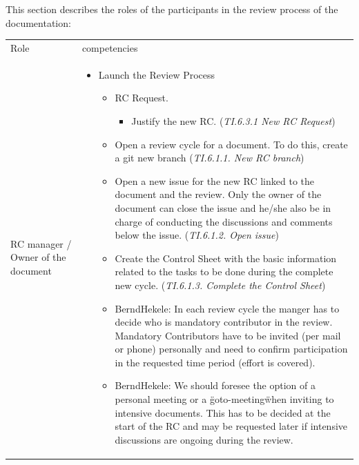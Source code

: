 \documentclass{template/openetcs_article}
\begin{document}
This section describes  the roles of the participants in the review process of the documentation:

\begin{flushleft}

\begin{tabular}{|m{3cm}|m{11cm}|}
\hline
\rowcolor{myblue}
\multicolumn{2}{|c|}{Roles} \\\hline
\rowcolor{lightgray}
Role &
competencies \\\hline
RC manager / Owner of the document &
\begin{itemize}
\item Launch the Review Process
\begin{itemize}
\item RC Request.
\begin{itemize}
\item Justify the new RC. ({\it TI.6.3.1 New RC Request})
\end{itemize}
\item Open a review cycle for a document. To do this, create a git new branch ({\it TI.6.1.1. New RC branch}) 
\item Open a new issue for the new RC linked to the document and the review. Only the owner of the document can close the issue and he/she also be in charge of conducting the discussions and comments below the issue.  ({\it TI.6.1.2. Open issue})
\item Create the Control Sheet with the basic information related to the tasks to be done during the complete new cycle. ({\it TI.6.1.3. Complete the Control Sheet})
\item BerndHekele: In each review cycle the manger has to decide who is mandatory contributor in the review. Mandatory Contributors have to be invited (per mail or phone) personally and need to confirm participation in the requested time period (effort is covered).

\item BerndHekele: We should foresee the option of a personal meeting or a \"goto-meeting\" when inviting to intensive documents. This has to be decided at the start of the RC and may be requested later if intensive discussions are ongoing during the review.


\end{itemize}
\end{itemize}
\end{tabular}
\end{flushleft}
\end{document}

